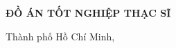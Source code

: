 \begin{titlepage}
{\begin{minipage}[t][0.9\textheight]{0.95\textwidth}
\begin{center}
\begin{flushleft}
            \vspace{1mm}

            \end{flushleft}

            \vspace{1.5cm}

            {\fontsize{20pt}{24pt}\selectfont \textbf{ĐỒ ÁN TỐT NGHIỆP THẠC SĨ}}

            \vfill

            {\fontsize{13pt}{15pt}\selectfont Thành phố Hồ Chí Minh, \submissiondatevn}

            \vspace{0.5cm}
        \end{center}
    \end{minipage}
    }
\end{titlepage}
